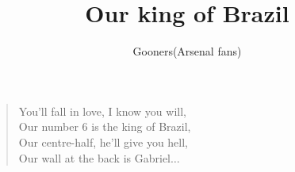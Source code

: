 \documentclass[a4paper,12pt]{article}
\title{Our king of Brazil}
\author{Gooners(Arsenal fans)}
\date{}
\begin{document}
	
	\maketitle
	
	\begin{verse}
		
		You'll fall in love, I know you will,  \\
		Our number 6 is the king of Brazil, \\
		Our centre-half, he'll give you hell, \\
		Our wall at the back is Gabriel$\ldots$
				
	\end{verse}
	
\end{document}
